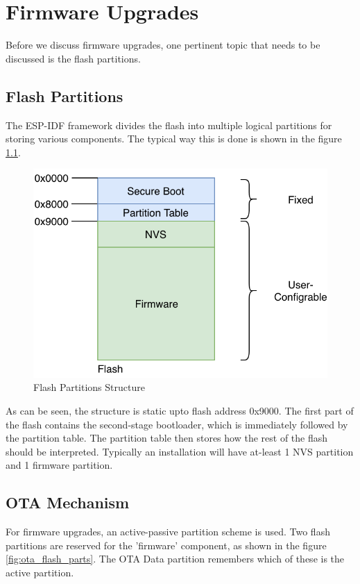 \documentclass[main.tex]{subfiles}
\begin{document}
\chapter{Firmware Upgrades}

Before we discuss firmware upgrades, one pertinent topic that needs to be discussed is the flash partitions.

\section{Flash Partitions}\label{sec:flash_partitions}
The ESP-IDF framework divides the flash into multiple logical partitions for storing various components. The typical way this is done is shown in the figure \ref{fig:flash_parts}.
\begin{figure}[h!]
    \centering
    \includegraphics[scale=0.4]{../../_static/flash_partitions_intro.png}
    \caption{Flash Partitions Structure}
    \label{fig:flash_parts}
\end{figure}

As can be seen, the structure is static upto flash address 0x9000. The first part of the flash contains the second-stage bootloader, which is immediately followed by the partition table. The partition table then stores how the rest of the flash should be interpreted. Typically an installation will have at-least 1 NVS partition and 1 firmware partition.

\section{OTA Mechanism}
For firmware upgrades, an active-passive partition scheme is used. Two flash partitions are reserved for the 'firmware' component, as shown in the figure \ref{fig:ota_flash_parts}. The OTA Data partition remembers which of these is the active partition.
\end{document}
